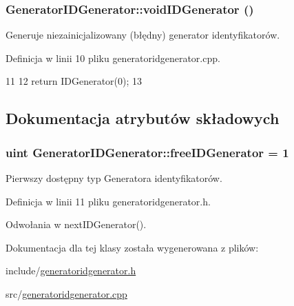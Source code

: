 \hypertarget{classGeneratorIDGenerator_af0d8b94b08eac9bfbeea41ef974d8745}{
\subsubsection[{voidIDGenerator}]{ GeneratorIDGenerator::voidIDGenerator ()}}
\label{classGeneratorIDGenerator_af0d8b94b08eac9bfbeea41ef974d8745}


Generuje niezainicjalizowany (błędny) generator identyfikatorów. 



Definicja w linii 10 pliku generatoridgenerator.cpp.




\begin{DoxyCode}
11 {
12     return IDGenerator(0);
13 }
\end{DoxyCode}




\subsection{Dokumentacja atrybutów składowych}
\hypertarget{classGeneratorIDGenerator_a6df8dcb43ce1c7e5f2d4610dfaf1d19e}{
\subsubsection[{freeIDGenerator}]{\setlength{\rightskip}{0pt plus 5cm}uint {\bf GeneratorIDGenerator::freeIDGenerator} = 1}}
\label{classGeneratorIDGenerator_a6df8dcb43ce1c7e5f2d4610dfaf1d19e}


Pierwszy dostępny typ Generatora identyfikatorów. 



Definicja w linii 11 pliku generatoridgenerator.h.



Odwołania w nextIDGenerator().



Dokumentacja dla tej klasy została wygenerowana z plików:\begin{DoxyCompactItemize}
\item 
include/\hyperlink{generatoridgenerator_8h}{generatoridgenerator.h}\item 
src/\hyperlink{generatoridgenerator_8cpp}{generatoridgenerator.cpp}\end{DoxyCompactItemize}

